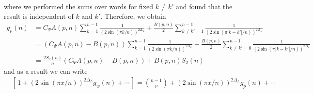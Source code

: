 \documentclass[11pt]{article}
\newcommand{\nn}{\nonumber}
\begin{document}
  where we performed the sums over words for fixed $k\neq k'$ and found that the
  result is independent of $k$ and $k'$. Therefore, we obtain
  \begin{align}
    g_{p}(n) & =C_{\Psi}A(p,n)\sum_{k=1}^{n-1}\frac{1}{(2\sin(\pi k/n))^{2\Delta_L}}+\frac{B(p,n)}{2}\sum_{k\neq k'=1}^{n-1}\frac{1}{(2\sin(\pi |k-k'|/n))^{2\Delta_L}}\nn      \\
             & =(C_{\Psi}A(p,n)-B(p,n))\sum_{k=1}^{n-1}\frac{1}{(2\sin(\pi k/n))^{2\Delta_L}}+\frac{B(p,n)}{2}\sum_{k\neq k'=0}^{n-1}\frac{1}{(2\sin(\pi |k-k'|/n))^{2\Delta_L}}\nn \\
             & =\frac{2S_{2}(n)}{n}(C_{\Psi}A(p,n)-B(p,n))+B(p,n)S_{2}(n)                                                                                         %
  \end{align}
  and as a result we can write
  \begin{align}
     & \left[\,1+(2\sin(\pi x/n))^{2\Delta_L}g_{w}(n)+\cdots\,\right]=\binom{n-1}{p}+(2\sin(\pi x/n))^{2\Delta_L}g_{p}(n)+\cdots\,
  \end{align}
\end{document}
